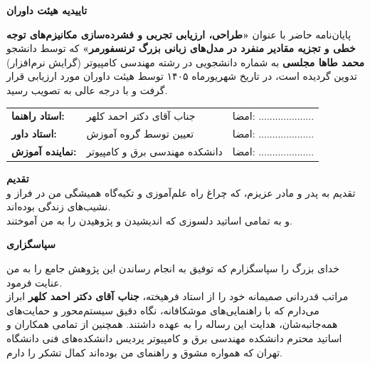 \documentclass[12pt,a4paper]{report}
\theoremstyle{definition}
\begin{document}
\newpage
\thispagestyle{empty}
\vspace*{3cm}
\begin{center}
{\Large \textbf{تاییدیه هیئت داوران}}\\[1cm]
\end{center}
پایان‌نامه حاضر با عنوان \textbf{«طراحی، ارزیابی تجربی و فشرده‌سازی مکانیزم‌های توجه خطی و تجزیه مقادیر منفرد  در مدل‌های زبانی بزرگ ترنسفورمر»} که توسط دانشجو \textbf{محمد طاها مجلسی} به شماره دانشجویی  در رشته مهندسی کامپیوتر (گرایش نرم‌افزار) تدوین گردیده است، در تاریخ شهریورماه ۱۴۰۵ توسط هیئت داوران مورد ارزیابی قرار گرفت و با درجه عالی به تصویب رسید.\\[2cm]
\begin{tabular}{lll}
\textbf{استاد راهنما:} & جناب آقای دکتر احمد کلهر & امضا: .................... \\[1cm]
\textbf{استاد داور:} & تعیین توسط گروه آموزش & امضا: .................... \\[1cm]
\textbf{نماینده آموزش:} & دانشکده مهندسی برق و کامپیوتر & امضا: ....................
\end{tabular}

\newpage
\thispagestyle{empty}
\vspace*{4cm}
\begin{center}
{\Large \textbf{تقدیم}}\\[1cm]
{\large تقدیم به پدر و مادر عزیزم، که چراغ راه علم‌آموزی و تکیه‌گاه همیشگی من در فراز و نشیب‌های زندگی بوده‌اند.}\\[0.5cm]
{\large و به تمامی اساتید دلسوزی که اندیشیدن و پژوهیدن را به من آموختند.}
\end{center}

\newpage
\thispagestyle{empty}
\vspace*{4cm}
\begin{center}
{\Large \textbf{سپاسگزاری}}\\[1cm]
\end{center}
خدای بزرگ را سپاسگزارم که توفیق به انجام رساندن این پژوهش جامع را به من عنایت فرمود.\\[0.4cm]
مراتب قدردانی صمیمانه خود را از استاد فرهیخته، \textbf{جناب آقای دکتر احمد کلهر} ابراز می‌دارم که با راهنمایی‌های موشکافانه، نگاه دقیق سیستم‌محور و حمایت‌های همه‌جانبه‌شان، هدایت این رساله را به عهده داشتند. همچنین از تمامی همکاران و اساتید محترم دانشکده مهندسی برق و کامپیوتر پردیس دانشکده‌های فنی دانشگاه تهران که همواره مشوق و راهنمای من بوده‌اند کمال تشکر را دارم.

\newpage
{}
\end{document}
